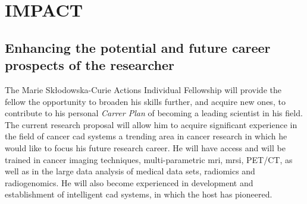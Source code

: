\section{IMPACT}
\label{sec:impact}

\subsection{Enhancing the potential and future career prospects of the researcher}
\label{sec:enhancement}


The Marie Sk\l{}odowska-Curie Actions Individual Fellowship will provide the fellow the opportunity to broaden his skills further, and acquire new ones, to contribute to his personal \emph{Carrer Plan} of becoming a leading scientist in his field.
The current research proposal will allow him to acquire significant experience in the field of cancer \ac{cad} systems a trending area in cancer research in which he would like to focus his future research career.
He will have access and will be trained in cancer imaging techniques, multi-parametric \ac{mri}, \ac{mrsi}, PET/CT, as well as in the large data analysis of medical data sets, radiomics and radiogenomics.
He will also become experienced in development and establishment of intelligent \ac{cad} systems, in which the host has pioneered. 

